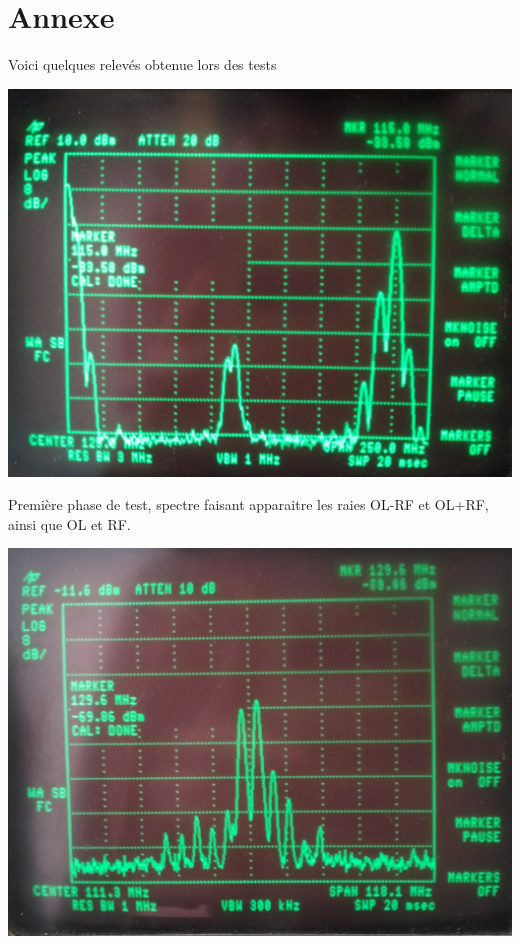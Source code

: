 \documentclass[a4paper,12pt]{report}            %
\begin{document}
\chapter{Annexe}
Voici quelques relevés obtenue lors des tests
\begin{center}\includegraphics[scale = 0.1]{pic/photo2.jpg}\\ \end{center}
    Première phase de test, spectre faisant apparaitre les raies OL-RF et OL+RF,
    ainsi que OL et RF.
\begin{center}\includegraphics[scale = 0.14]{pic/photo3.jpg}\\ \end{center}
\end{document}
